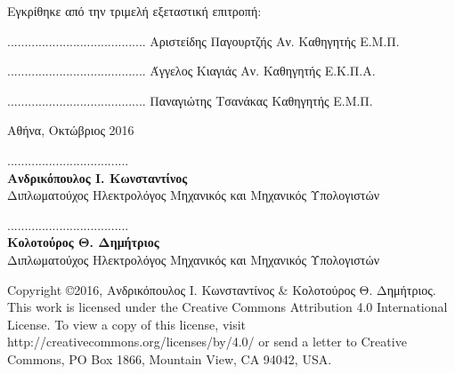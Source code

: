 \documentclass[
11pt, %
english, %
singlespacing, %
parskip, %
headsepline, %
]{MastersDoctoralThesis} %
\begin{document}
\begin{center}
\noindent
\small
Εγκρίθηκε από την τριμελή εξεταστική επιτροπή:

\vfill

\begin{center}
\scriptsize
\parbox[b]{0.3\textwidth} {\center
	........................................
	Αριστείδης Παγουρτζής
	Αν. Καθηγητής Ε.Μ.Π.
}
\parbox[b]{0.3\textwidth} {\center
	........................................
	Άγγελος Κιαγιάς
	Αν. Καθηγητής Ε.Κ.Π.Α.
}
\parbox[b]{0.3\textwidth} {\center
	........................................
	Παναγιώτης Τσανάκας
	Καθηγητής Ε.Μ.Π.
}
\end{center}


\vfill
{\large Αθήνα, Οκτώβριος 2016}\\[4cm] %

\end{center}


\pagebreak


\vspace{30ex}
\noindent
................................... \\
\textbf{Ανδρικόπουλος Ι. Κωνσταντίνος} \\
Διπλωματούχος Ηλεκτρολόγος Μηχανικός και Μηχανικός Υπολογιστών \\
\vspace{8ex}

\noindent
................................... \\
\textbf{Κολοτούρος Θ. Δημήτριος} \\
Διπλωματούχος Ηλεκτρολόγος Μηχανικός και Μηχανικός Υπολογιστών \\
\vspace{8ex}

\vfill

\small
\noindent
Copyright \copyright \hspace{1em}2016, Ανδρικόπουλος Ι. Κωνσταντίνος \& Κολοτούρος Θ. Δημήτριος.\\

This work is licensed under the Creative Commons Attribution 4.0 International License. To view a copy of this license, visit http://creativecommons.org/licenses/by/4.0/ or send a letter to Creative Commons, PO Box 1866, Mountain View, CA 94042, USA. \\[0.2cm]
\pagebreak
\end{document}
